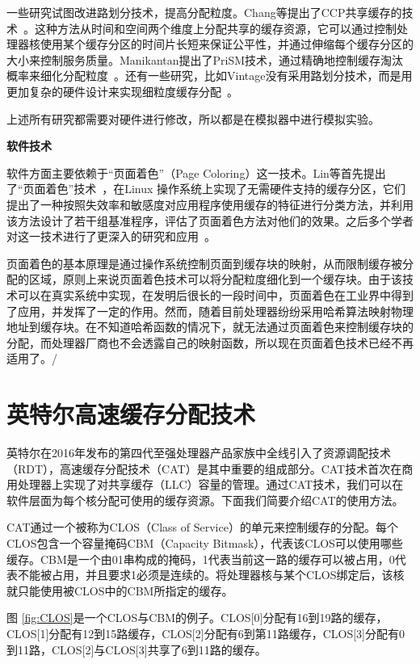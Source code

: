 一些研究试图改进路划分技术，提高分配粒度。Chang等提出了CCP共享缓存的技术~\parencite{chang2006cooperative,chang2014cooperative}。这种方法从时间和空间两个维度上分配共享的缓存资源，它可以通过控制处理器核使用某个缓存分区的时间片长短来保证公平性，并通过伸缩每个缓存分区的大小来控制服务质量。Manikantan提出了PriSM技术，通过精确地控制缓存淘汰概率来细化分配粒度~\parencite{manikantan2012probabilistic}。还有一些研究，比如Vintage没有采用路划分技术，而是用更加复杂的硬件设计来实现细粒度缓存分配~\parencite{sanchez2011vantage}。

上述所有研究都需要对硬件进行修改，所以都是在模拟器中进行模拟实验。

\textbf{软件技术}

软件方面主要依赖于“页面着色”（Page Coloring）这一技术。Lin等首先提出了“页面着色”技术~\parencite{lin2008gaining}，在Linux 操作系统上实现了无需硬件支持的缓存分区，它们提出了一种按照失效率和敏感度对应用程序使用缓存的特征进行分类方法，并利用该方法设计了若干组基准程序，评估了页面着色方法对他们的效果。之后多个学者对这一技术进行了更深入的研究和应用~\parencite{zhang2009towards,soares2008reducing,tam2007managing,azimi2009enhancing,lu2009soft}。

页面着色的基本原理是通过操作系统控制页面到缓存块的映射，从而限制缓存被分配的区域，原则上来说页面着色技术可以将分配粒度细化到一个缓存块。由于该技术可以在真实系统中实现，在发明后很长的一段时间中，页面着色在工业界中得到了应用，并发挥了一定的作用。然而，随着目前处理器纷纷采用哈希算法映射物理地址到缓存块。在不知道哈希函数的情况下，就无法通过页面着色来控制缓存块的分配，而处理器厂商也不会透露自己的映射函数，所以现在页面着色技术已经不再适用了。/
   

\section{英特尔高速缓存分配技术}
英特尔在2016年发布的第四代至强处理器产品家族中全线引入了资源调配技术（RDT），高速缓存分配技术（CAT）是其中重要的组成部分。CAT技术首次在商用处理器上实现了对共享缓存（LLC）容量的管理。通过CAT技术，我们可以在软件层面为每个核分配可使用的缓存资源。下面我们简要介绍CAT的使用方法。

CAT通过一个被称为CLOS（Class of Service）的单元来控制缓存的分配。每个CLOS包含一个容量掩码CBM（Capacity Bitmask），代表该CLOS可以使用哪些缓存。CBM是一个由01串构成的掩码，1代表当前这一路的缓存可以被占用，0代表不能被占用，并且要求1必须是连续的。将处理器核与某个CLOS绑定后，该核就只能使用被CLOS中的CBM所指定的缓存。

图 \ref{fig:CLOS}是一个CLOS与CBM的例子。CLOS[0]分配有16到19路的缓存，CLOS[1]分配有12到15路缓存，CLOS[2]分配有6到第11路缓存，CLOS[3]分配有0到11路，CLOS[2]与CLOS[3]共享了6到11路的缓存。

